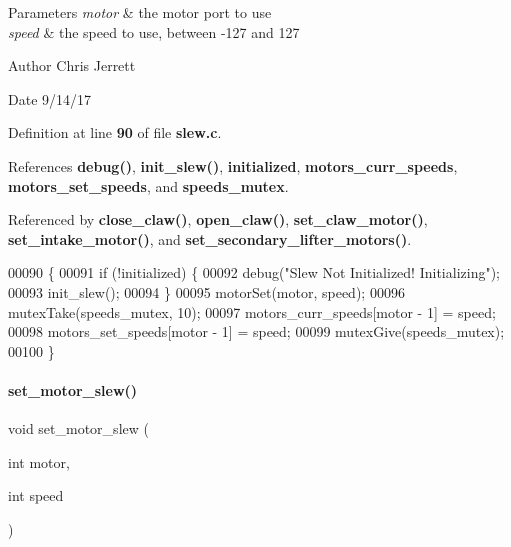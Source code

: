 \begin{DoxyParams}{Parameters}
{\em motor} & the motor port to use \\
\hline
{\em speed} & the speed to use, between -\/127 and 127 \\
\hline
\end{DoxyParams}
\begin{DoxyAuthor}{Author}
Chris Jerrett 
\end{DoxyAuthor}
\begin{DoxyDate}{Date}
9/14/17 
\end{DoxyDate}


Definition at line \textbf{ 90} of file \textbf{ slew.\+c}.



References \textbf{ debug()}, \textbf{ init\+\_\+slew()}, \textbf{ initialized}, \textbf{ motors\+\_\+curr\+\_\+speeds}, \textbf{ motors\+\_\+set\+\_\+speeds}, and \textbf{ speeds\+\_\+mutex}.



Referenced by \textbf{ close\+\_\+claw()}, \textbf{ open\+\_\+claw()}, \textbf{ set\+\_\+claw\+\_\+motor()}, \textbf{ set\+\_\+intake\+\_\+motor()}, and \textbf{ set\+\_\+secondary\+\_\+lifter\+\_\+motors()}.


\begin{DoxyCode}
00090                                                \{
00091   \textcolor{keywordflow}{if} (!initialized) \{
00092     debug(\textcolor{stringliteral}{"Slew Not Initialized! Initializing"});
00093     init_slew();
00094   \}
00095   motorSet(motor, speed);
00096   mutexTake(speeds_mutex, 10);
00097   motors_curr_speeds[motor - 1] = speed;
00098   motors_set_speeds[motor - 1] = speed;
00099   mutexGive(speeds_mutex);
00100 \}
\end{DoxyCode}
\mbox{\label{a00143_a7dff2b79dffe55fb936d977594d7c01d}} 
\paragraph{set\+\_\+motor\+\_\+slew()}
{\footnotesize\ttfamily void set\+\_\+motor\+\_\+slew (\begin{DoxyParamCaption}\item[{int}]{motor,  }\item[{int}]{speed }\end{DoxyParamCaption})}



